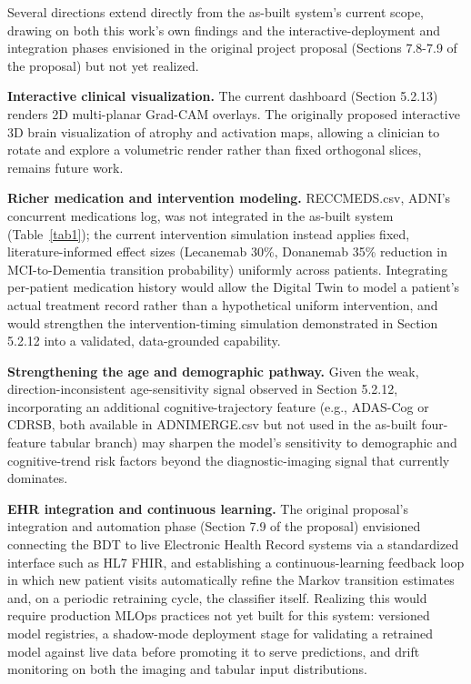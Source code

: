 \documentclass[pdflatex,sn-mathphys-num]{sn-jnl}%
\theoremstyle{thmstyleone}%
\theoremstyle{thmstyletwo}%
\theoremstyle{thmstylethree}%
\begin{document}
Several directions extend directly from the as-built system's current scope, drawing on both this work's own findings and the interactive-deployment and integration phases envisioned in the original project proposal (Sections 7.8-7.9 of the proposal) but not yet realized.

\textbf{Interactive clinical visualization.} The current dashboard (Section 5.2.13) renders 2D multi-planar Grad-CAM overlays. The originally proposed interactive 3D brain visualization of atrophy and activation maps, allowing a clinician to rotate and explore a volumetric render rather than fixed orthogonal slices, remains future work.

\textbf{Richer medication and intervention modeling.} RECCMEDS.csv, ADNI's concurrent medications log, was not integrated in the as-built system (Table~\ref{tab1}); the current intervention simulation instead applies fixed, literature-informed effect sizes (Lecanemab 30\%, Donanemab 35\% reduction in MCI-to-Dementia transition probability) uniformly across patients. Integrating per-patient medication history would allow the Digital Twin to model a patient's actual treatment record rather than a hypothetical uniform intervention, and would strengthen the intervention-timing simulation demonstrated in Section 5.2.12 into a validated, data-grounded capability.

\textbf{Strengthening the age and demographic pathway.} Given the weak, direction-inconsistent age-sensitivity signal observed in Section 5.2.12, incorporating an additional cognitive-trajectory feature (e.g., ADAS-Cog or CDRSB, both available in ADNIMERGE.csv but not used in the as-built four-feature tabular branch) may sharpen the model's sensitivity to demographic and cognitive-trend risk factors beyond the diagnostic-imaging signal that currently dominates.

\textbf{EHR integration and continuous learning.} The original proposal's integration and automation phase (Section 7.9 of the proposal) envisioned connecting the BDT to live Electronic Health Record systems via a standardized interface such as HL7 FHIR, and establishing a continuous-learning feedback loop in which new patient visits automatically refine the Markov transition estimates and, on a periodic retraining cycle, the classifier itself. Realizing this would require production MLOps practices not yet built for this system: versioned model registries, a shadow-mode deployment stage for validating a retrained model against live data before promoting it to serve predictions, and drift monitoring on both the imaging and tabular input distributions.
\end{document}

